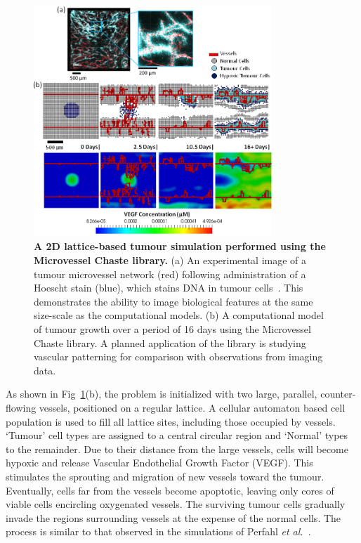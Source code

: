 \documentclass[10pt,letterpaper]{article}
\begin{document}
\begin{figure}[!h]
\centering
\includegraphics[width=0.8\textwidth]{Fig3.png}
\caption{{\bf A 2D lattice-based tumour simulation performed using the Microvessel Chaste library.}
(a) An experimental image of a tumour microvessel network (red) following administration of a Hoescht stain (blue), which stains DNA in tumour cells~\cite{Grogan2016}. This demonstrates the ability to image biological features at the same size-scale as the computational models. (b) A computational model of tumour growth over a period of 16 days using the Microvessel Chaste library. A planned application of the library is studying vascular patterning for comparison with observations from imaging data.}
\label{fig3}
\end{figure}

As shown in Fig~\ref{fig3}(b), the problem is initialized with two large, parallel, counter-flowing vessels, positioned on a regular lattice. A cellular automaton based cell population is used to fill all lattice sites, including those occupied by vessels. `Tumour' cell types are assigned to a central circular region and `Normal' types to the remainder. Due to their distance from the large vessels, cells will become hypoxic and release Vascular Endothelial Growth Factor (VEGF). This stimulates the sprouting and migration of new vessels toward the tumour. Eventually, cells far from the vessels become apoptotic, leaving only cores of viable cells encircling oxygenated vessels. The surviving tumour cells gradually invade the regions surrounding vessels at the expense of the normal cells. The process is similar to that observed in the simulations of Perfahl \emph{et al.}~\cite{Perfahl2011}.
\end{document}
